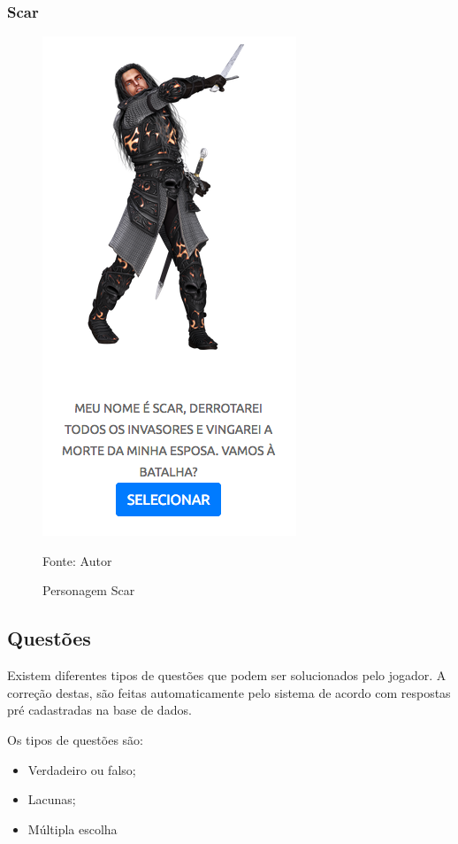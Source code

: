 \subsubsection{Scar}
\begin{figure}[h]
	\centering
	\includegraphics[keepaspectratio=true,scale=0.6]{figuras/scar.png}
	\caption{Personagem Scar}
	Fonte: Autor
	\label{scar}
\end{figure}

\subsection{Questões}
Existem diferentes tipos de questões que podem ser solucionados pelo jogador. A correção destas, são feitas automaticamente
pelo sistema de acordo com respostas pré cadastradas na base de dados.

Os  tipos de questões são:

\begin{itemize}
	\item Verdadeiro ou falso;
	\item Lacunas;
	\item Múltipla escolha
\end{itemize}

